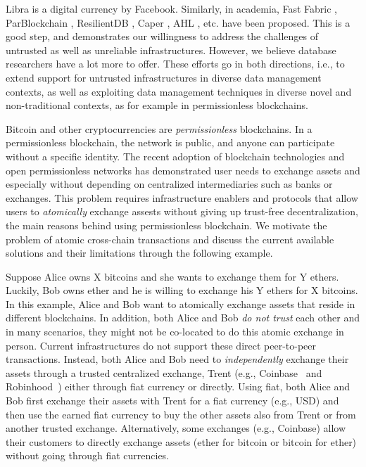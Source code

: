 \documentclass[11pt]{article}
\begin{document}
Libra \cite{libra2019libra} is a digital currency by Facebook.
Similarly, in academia, Fast Fabric \cite{fastfabric2019}, ParBlockchain \cite{amiri2019parblockchain},
ResilientDB \cite{gupta2020resilientdb}, Caper \cite{amiri2019caper}, AHL \cite{dang2018towards}, etc. have been proposed. This is a good step, and demonstrates our willingness to address the challenges of untrusted as well as unreliable infrastructures.  However, we believe database researchers have a lot more to offer.  These efforts go in both directions, i.e., to extend support for untrusted infrastructures in diverse data management contexts, as well as exploiting data management techniques in diverse novel and non-traditional contexts, as for example in permissionless blockchains.


Bitcoin and other cryptocurrencies are {\em permissionless} blockchains.
In a permissionless blockchain, the network is public, and anyone can participate without a specific identity.
The recent adoption of blockchain technologies and open 
permissionless networks has demonstrated user needs to exchange assets
and especially without depending on centralized 
intermediaries such as banks or exchanges. 
This problem requires infrastructure enablers and protocols that allow users to 
{\em atomically} exchange assests without giving up trust-free decentralization,
the main reasons behind using  permissionless blockchain. We motivate the problem
of atomic cross-chain transactions and discuss
the current available solutions and their limitations through the following example.  

Suppose Alice owns X bitcoins and she wants to exchange them for Y 
ethers. Luckily, Bob owns ether and he is willing to exchange his Y ethers for X bitcoins. 
In this example, Alice and Bob want 
to atomically exchange assets that reside in different blockchains. In addition,
both Alice and Bob \textit{do not trust} each other and in many scenarios, 
they might not be co-located to do this atomic exchange in person.
Current infrastructures
do not support these direct peer-to-peer transactions. 
Instead, both Alice and Bob need to \textit{independently} exchange their 
assets through a trusted centralized exchange, Trent 
(e.g., Coinbase~\cite{coinbase} and Robinhood~\cite{robinhood}) either through
fiat currency or directly.  Using fiat, both Alice
and Bob first exchange their assets with Trent for a fiat currency (e.g., USD) and 
then use the earned fiat currency to buy the other assets also from Trent or from 
another trusted exchange. Alternatively, some exchanges (e.g., Coinbase) allow their 
customers to directly exchange assets (ether for bitcoin or bitcoin for ether) 
without going through fiat currencies.
\end{document}
